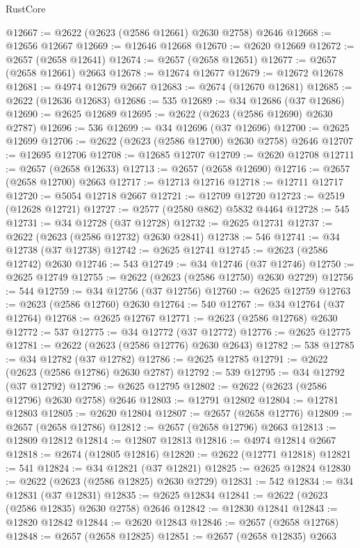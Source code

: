 \begin{lexlean}{RustCore}
\begin{coremodule}
@12667 := @2622 (@2623 (@2586 @12661) @2630 @2758) @2646
@12668 := @12656 @12667
@12669 := @12646 @12668
@12670 := @2620 @12669
@12672 := @2657 (@2658 @12641)
@12674 := @2657 (@2658 @12651)
@12677 := @2657 (@2658 @12661) @2663
@12678 := @12674 @12677
@12679 := @12672 @12678
@12681 := @4974 @12679 @2667
@12683 := @2674 (@12670 @12681)
@12685 := @2622 (@12636 @12683)
@12686 := 535
@12689 := @34 @12686 (@37 @12686)
@12690 := @2625 @12689
@12695 := @2622 (@2623 (@2586 @12690) @2630 @2787)
@12696 := 536
@12699 := @34 @12696 (@37 @12696)
@12700 := @2625 @12699
@12706 := @2622 (@2623 (@2586 @12700) @2630 @2758) @2646
@12707 := @12695 @12706
@12708 := @12685 @12707
@12709 := @2620 @12708
@12711 := @2657 (@2658 @12633)
@12713 := @2657 (@2658 @12690)
@12716 := @2657 (@2658 @12700) @2663
@12717 := @12713 @12716
@12718 := @12711 @12717
@12720 := @5054 @12718 @2667
@12721 := @12709 @12720
@12723 := @2519 (@12628 @12721)
@12727 := @2577 (@2580 @862) @5832 @4464
@12728 := 545
@12731 := @34 @12728 (@37 @12728)
@12732 := @2625 @12731
@12737 := @2622 (@2623 (@2586 @12732) @2630 @2841)
@12738 := 546
@12741 := @34 @12738 (@37 @12738)
@12742 := @2625 @12741
@12745 := @2623 (@2586 @12742) @2630
@12746 := 543
@12749 := @34 @12746 (@37 @12746)
@12750 := @2625 @12749
@12755 := @2622 (@2623 (@2586 @12750) @2630 @2729)
@12756 := 544
@12759 := @34 @12756 (@37 @12756)
@12760 := @2625 @12759
@12763 := @2623 (@2586 @12760) @2630
@12764 := 540
@12767 := @34 @12764 (@37 @12764)
@12768 := @2625 @12767
@12771 := @2623 (@2586 @12768) @2630
@12772 := 537
@12775 := @34 @12772 (@37 @12772)
@12776 := @2625 @12775
@12781 := @2622 (@2623 (@2586 @12776) @2630 @2643)
@12782 := 538
@12785 := @34 @12782 (@37 @12782)
@12786 := @2625 @12785
@12791 := @2622 (@2623 (@2586 @12786) @2630 @2787)
@12792 := 539
@12795 := @34 @12792 (@37 @12792)
@12796 := @2625 @12795
@12802 := @2622 (@2623 (@2586 @12796) @2630 @2758) @2646
@12803 := @12791 @12802
@12804 := @12781 @12803
@12805 := @2620 @12804
@12807 := @2657 (@2658 @12776)
@12809 := @2657 (@2658 @12786)
@12812 := @2657 (@2658 @12796) @2663
@12813 := @12809 @12812
@12814 := @12807 @12813
@12816 := @4974 @12814 @2667
@12818 := @2674 (@12805 @12816)
@12820 := @2622 (@12771 @12818)
@12821 := 541
@12824 := @34 @12821 (@37 @12821)
@12825 := @2625 @12824
@12830 := @2622 (@2623 (@2586 @12825) @2630 @2729)
@12831 := 542
@12834 := @34 @12831 (@37 @12831)
@12835 := @2625 @12834
@12841 := @2622 (@2623 (@2586 @12835) @2630 @2758) @2646
@12842 := @12830 @12841
@12843 := @12820 @12842
@12844 := @2620 @12843
@12846 := @2657 (@2658 @12768)
@12848 := @2657 (@2658 @12825)
@12851 := @2657 (@2658 @12835) @2663

\end{coremodule}
\end{lexlean}

